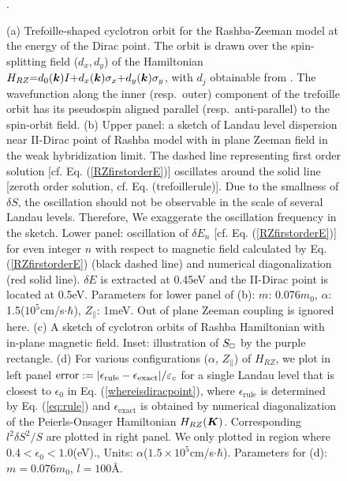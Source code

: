\documentclass[aps, prb, showpacs, twocolumn, notitlepage, superscriptaddress]{revtex4-1}
\begin{document}
\begin{figure}
\caption{(a) Trefoille-shaped cyclotron orbit for the Rashba-Zeeman model at the energy of the Dirac point. The orbit is drawn over the  spin-splitting field ($d_x,d_y$) of the Hamiltonian $H_{RZ}{=}d_0(\boldsymbol{k})I{+}d_x(\boldsymbol{k})\sigma_x{+}d_y(\boldsymbol{k})\sigma_y$, with $d_j$ obtainable from . The wavefunction along the inner (resp.\ outer) component of the trefoille orbit has its pseudospin aligned parallel (resp.\ anti-parallel) to the spin-orbit field. (b) Upper panel: a sketch of Landau level dispersion near II-Dirac point of Rashba model with in plane Zeeman field in the weak hybridization limit. The dashed line representing first order solution [cf. Eq. (\ref{RZfirstorderE})] oscillates around the solid line [zeroth order solution, cf. Eq. ({trefoillerule})]. Due to the smallness of $\delta S$, the oscillation should not be observable in the scale of several Landau levels. Therefore, We exaggerate the oscillation frequency in the sketch. Lower panel: oscillation of $\delta E_n$ [cf. Eq. (\ref{RZfirstorderE})] for even integer $n$ with respect to magnetic field calculated by Eq. (\ref{RZfirstorderE}) (black dashed line) and numerical diagonalization (red solid line). $\delta E$ is extracted at 0.45eV and the II-Dirac point is located at 0.5eV. Parameters for lower panel of (b): $m$: 0.076$m_0$, $\alpha$: 1.5($10^{5}$cm/s$\cdot\hbar$), $Z_\parallel$: 1meV. Out of plane Zeeman coupling is ignored here. (c) A sketch of cyclotron orbits of Rashba Hamiltonian with in-plane magnetic field. Inset: illustration of $S_{\scriptscriptstyle{\square}}$ by the purple rectangle. (d) For various configurations ($\alpha$, $Z_\parallel$) of $H_{RZ}$, we plot in left panel $\text{error}:=|\epsilon_\text{rule}-\epsilon_\text{exact}|/\varepsilon_c$ for a single Landau level that is closest to $\epsilon_0$ in Eq. (\ref{whereisdiracpoint}), where $\epsilon_\text{rule}$ is determined by Eq. (\ref{eq:rule}) and $\epsilon_{\text{exact}}$ is obtained by numerical diagonalization of the Peierls-Onsager Hamiltonian $H_{RZ}(\boldsymbol{K})$. Corresponding $l^2 \delta S^2/S$ are plotted in right panel. We only plotted in region where $0.4<\epsilon_0<1.0$(eV).\cite{RZfignote}, Units: $\alpha$($1.5\times 10^{5}$cm/s$\cdot\hbar$). Parameters for (d): $m=0.076m_0$, $l=100$\AA. \label{fig:RZ}}.
\end{figure}
\end{document}
